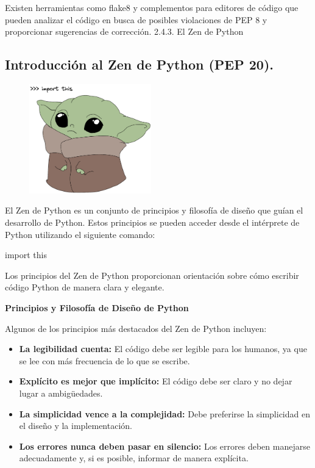 \documentclass[
  a4paper,
  DIV=11,
  numbers=noendperiod,
  onepage,
  openany]{scrreprt}
\newenvironment{Shaded}{\begin{snugshade}}{\end{snugshade}}
\newcommand{\ImportTok}[1]{\textcolor[rgb]{0.00,0.46,0.62}{#1}}
\newcommand{\NormalTok}[1]{\textcolor[rgb]{0.00,0.23,0.31}{#1}}
\providecommand{\tightlist}{%
  \setlength{\itemsep}{0pt}\setlength{\parskip}{0pt}}\usepackage{longtable,booktabs,array}
\begin{document}
Existen herramientas como flake8 y complementos para editores de código
que pueden analizar el código en busca de posibles violaciones de PEP 8
y proporcionar sugerencias de corrección. 2.4.3. El Zen de Python

\subsection{Introducción al Zen de Python (PEP
20).}\label{introducciuxf3n-al-zen-de-python-pep-20.}

\begin{figure}

{\centering \includegraphics[width=2.08333in,height=\textheight]{unidades/unidad1/images/import this-2.png}

}

\end{figure}

El Zen de Python es un conjunto de principios y filosofía de diseño que
guían el desarrollo de Python. Estos principios se pueden acceder desde
el intérprete de Python utilizando el siguiente comando:

\begin{Shaded}
\begin{Highlighting}[]
\ImportTok{import}\NormalTok{ this}
\end{Highlighting}
\end{Shaded}

Los principios del Zen de Python proporcionan orientación sobre cómo
escribir código Python de manera clara y elegante.

\textbf{Principios y Filosofía de Diseño de Python}

Algunos de los principios más destacados del Zen de Python incluyen:

\begin{itemize}
\tightlist
\item
  \textbf{La legibilidad cuenta:} El código debe ser legible para los
  humanos, ya que se lee con más frecuencia de lo que se escribe.
\item
  \textbf{Explícito es mejor que implícito:} El código debe ser claro y
  no dejar lugar a ambigüedades.
\item
  \textbf{La simplicidad vence a la complejidad:} Debe preferirse la
  simplicidad en el diseño y la implementación.
\item
  \textbf{Los errores nunca deben pasar en silencio:} Los errores deben
  manejarse adecuadamente y, si es posible, informar de manera
  explícita.
\end{itemize}
\end{document}
